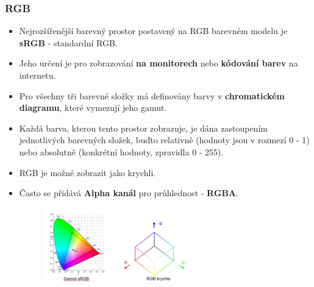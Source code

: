 \subsubsection{RGB}
\begin{itemize}
	\item Nejrozšířenější barevný prostor postavený na RGB barevném modelu je \textbf{sRGB} - standardní RGB. 
	\item Jeho určení je pro zobrazování \textbf{na monitorech} nebo \textbf{kódování barev} na internetu. 
	\item Pro všechny tři barevné složky má definovány barvy v \textbf{chromatickém diagramu}, které vymezují jeho gamut. 
	\item Každá barva, kterou tento prostor zobrazuje, je dána zastoupením jednotlivých barevných složek, buďto relativně (hodnoty jsou v rozmezí 0 - 1) nebo absolutně (konkrétní  hodnoty, zpravidla 0 - 255).
	\item RGB je možné zobrazit jako krychli.
	\item Často se přidává \textbf{Alpha kanál} pro průhlednost - \textbf{RGBA}.
	\begin{figure}[H]
	\centering
	\includegraphics[width=0.6\textwidth]{assets/1_rgb_gamut_krychle}
	\end{figure}
\end{itemize}

